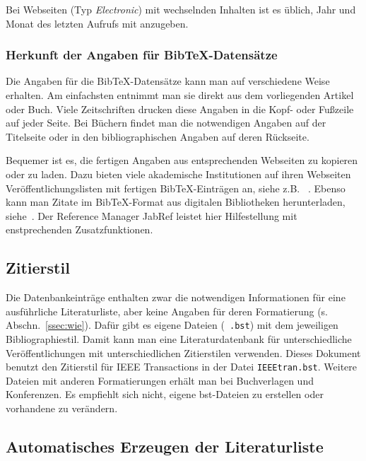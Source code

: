 \documentclass[a4paper, 10pt]{article}
\begin{document}
Bei Webseiten (Typ \emph{Electronic}) mit wechselnden Inhalten ist es
\"ublich,  Jahr und Monat des letzten Aufrufs mit anzugeben.

\subsubsection{Herkunft der Angaben f\"ur BibTeX-Datens\"atze}

Die Angaben f\"ur die BibTeX-Datens\"atze kann man auf verschiedene Weise
erhalten. Am einfachsten entnimmt man sie direkt aus dem vorliegenden Artikel
oder Buch. Viele Zeitschriften drucken diese Angaben in die Kopf- oder
Fu{\ss}zeile auf jeder Seite. Bei B\"uchern findet man die notwendigen Angaben
auf der Titelseite oder in den bibliographischen Angaben auf deren R\"uckseite.

Bequemer ist es, die fertigen Angaben aus entsprechenden Webseiten zu kopieren
oder zu laden. Dazu bieten viele akademische Institutionen auf ihren
Webseiten Ver\"offentlichungslisten mit fertigen BibTeX-Eintr\"agen an,
siehe z.B.~ \cite{LMS:Zeitschriften:2011}.
Ebenso kann man Zitate im BibTeX-Format aus digitalen Bibliotheken
herunterladen, siehe~\cite{IEEE:Xplore:2011}. Der Reference Manager JabRef 
leistet hier Hilfestellung mit enstprechenden Zusatzfunktionen.  


\subsection{Zitierstil}

Die Datenbankeintr\"age enthalten zwar die notwendigen Informationen f\"ur eine
ausf\"uhrliche Literaturliste, aber keine Angaben f\"ur  deren Formatierung (s.
Abschn.~\ref{ssec:wie}). Daf\"ur gibt es eigene Dateien ({\tt
.bst}) mit dem jeweiligen Bibliographiestil. Damit kann man eine
Literaturdatenbank f\"ur unterschiedliche Ver\"offentlichungen mit
unterschiedlichen Zitierstilen verwenden. Dieses Dokument benutzt den
Zitierstil f\"ur IEEE Transactions  in der Datei {\tt IEEEtran.bst}. Weitere
Dateien mit anderen Formatierungen erh\"alt man bei Buchverlagen und
Konferenzen. Es empfiehlt sich nicht, eigene bst-Dateien zu erstellen oder
vorhandene zu ver\"andern.

\subsection{Automatisches Erzeugen der Literaturliste}
\end{document}
